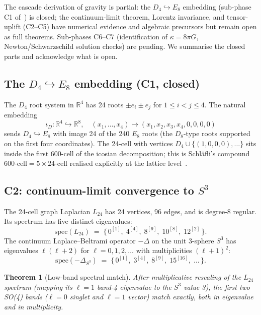 \documentclass[11pt]{article}
\theoremstyle{plain}
\newtheorem{theorem}{Theorem}[section]
\theoremstyle{definition}
\theoremstyle{remark}
\begin{document}
The cascade derivation of gravity is partial: the $D_4 \hookrightarrow E_8$ embedding (sub-phase C1 of~\citealp{cascadeGR}) is closed; the continuum-limit theorem, Lorentz invariance, and tensor-uplift (C2--C5) have numerical evidence and algebraic precursors but remain open as full theorems. Sub-phases C6--C7 (identification of $\kappa = 8\pi G$, Newton/Schwarzschild solution checks) are pending. We summarise the closed parts and acknowledge what is open.

\subsection{The $D_4 \hookrightarrow E_8$ embedding (C1, closed)}

The $D_4$ root system in $\mathbb{R}^4$ has 24 roots $\pm e_i \pm e_j$ for $1 \le i < j \le 4$. The natural embedding
\[
  \iota_D: \mathbb{R}^4 \hookrightarrow \mathbb{R}^8, \quad (x_1, \dots, x_4) \mapsto (x_1, x_2, x_3, x_4, 0, 0, 0, 0)
\]
sends $D_4 \hookrightarrow E_8$ with image 24 of the 240 $E_8$ roots (the $D_8$-type roots supported on the first four coordinates). The 24-cell with vertices $D_4 \cup \{(1, 0, 0, 0), \ldots\}$ sits inside the first 600-cell of the icosian decomposition; this is Schl\"afli's compound $600\text{-cell} = 5 \times 24\text{-cell}$ realised explicitly at the lattice level~\citep[C1]{cascadeGR}.

\subsection{C2: continuum-limit convergence to $S^3$}\label{sec:gravity-C2}

The 24-cell graph Laplacian $L_{24}$ has 24 vertices, 96 edges, and is degree-8 regular. Its spectrum has five distinct eigenvalues:
\begin{equation}\label{eq:L24-spectrum}
  \mathrm{spec}(L_{24}) \;=\; \bigl\{\, 0^{[1]}, \; 4^{[4]}, \; 8^{[9]}, \; 10^{[8]}, \; 12^{[2]}\,\bigr\}.
\end{equation}
The continuum Laplace--Beltrami operator $-\Delta$ on the unit 3-sphere $S^3$ has eigenvalues $\ell(\ell + 2)$ for $\ell = 0, 1, 2, \ldots$ with multiplicities $(\ell + 1)^2$:
\begin{equation}\label{eq:S3-spectrum}
  \mathrm{spec}(-\Delta_{S^3}) \;=\; \bigl\{\, 0^{[1]}, \; 3^{[4]}, \; 8^{[9]}, \; 15^{[16]}, \;\ldots\,\bigr\}.
\end{equation}

\begin{theorem}[Low-band spectral match]\label{thm:L24-S3-match}
After multiplicative rescaling of the $L_{24}$ spectrum (mapping its $\ell=1$ band-4 eigenvalue to the $S^3$ value 3), the first two SO(4) bands ($\ell = 0$ singlet and $\ell = 1$ vector) match exactly, both in eigenvalue and in multiplicity.
\end{theorem}
\end{document}
